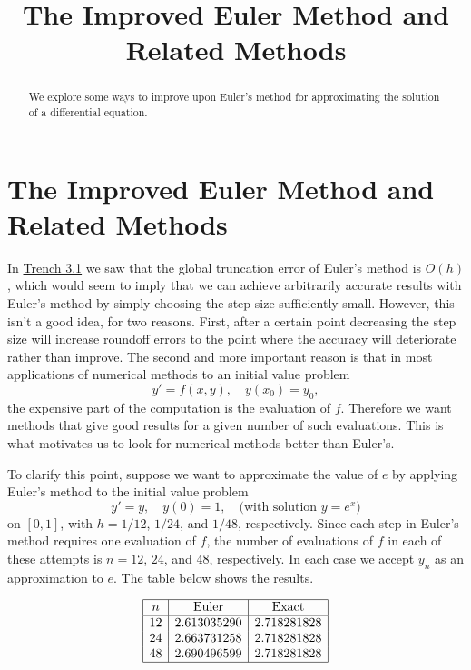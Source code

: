 \documentclass{ximera}
\title{The Improved Euler Method and Related Methods}%
\begin{document}
\begin{abstract}
We explore some ways to improve upon Euler's method for approximating the solution of a differential equation.
\end{abstract}

\maketitle

\section*{The Improved Euler Method and Related Methods}

In \href{https://ximera.osu.edu/ode/main/eulersMethod/eulersMethod}{Trench 3.1} we saw that the global truncation error of
Euler's method is $O(h)$, which would seem to imply that we can
achieve arbitrarily accurate results with Euler's method by simply
choosing the step size sufficiently small. However, this
isn't  a good idea, for two reasons. First,
after a certain point decreasing the step size will
increase roundoff errors to the point where the accuracy
will deteriorate rather than improve.
 The second
and more important reason is that in most applications of numerical
methods to an initial value problem
\begin{equation} \label{eq:3.2.1}
y'=f(x,y),\quad y(x_0)=y_0,
\end{equation}
the expensive part of the computation is the evaluation of $f$.
Therefore we want methods that give good results for a given number
of such evaluations. This is what motivates us to look for numerical
methods better than Euler's.

To clarify this point, suppose  we want to approximate the value of $e$
by applying Euler's method to the initial value problem
$$
y'=y,\quad y(0)=1,\quad\mbox{(with solution $y=e^x$)}
$$
on $[0,1]$, with $h=1/12$, $1/24$, and $1/48$, respectively. Since
each step in Euler's method requires one evaluation of $f$, the number
of evaluations of $f$ in each of these attempts is $n=12$, $24$, and
$48$, respectively. In each case we accept $y_n$ as an approximation
to $e$.  The table below shows the results. 


$$
\begin{array}{|c|c|c|}
\hline
n&
\text{Euler}&
\text{Exact}\\ \hline
12 & 2.613035290  & 2.718281828 \\
24 & 2.663731258   & 2.718281828 \\
48 & 2.690496599  & 2.718281828
\\
\hline
\end{array}
$$
\end{document}
